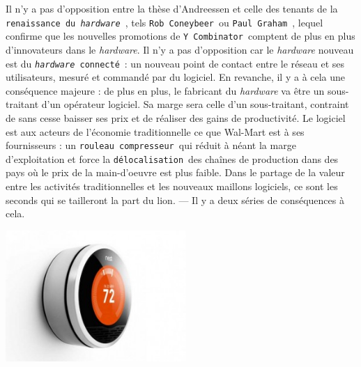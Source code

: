 \documentclass[11pt,twoside,a4paper]{article}
\begin{document}
\begin{minipage}[h]{12cm}
	Il n'y a pas d'opposition entre la th{\`e}se d'Andreessen et celle des tenants de la \texttt{renaissance du \emph{hardware}}~\footnotemark, tels \texttt{Rob Coneybeer}~\footnotemark ou \texttt{Paul Graham}~\footnotemark, lequel confirme que les nouvelles promotions de \texttt{Y Combinator}~\footnotemark comptent de plus en plus d'innovateurs dans le \emph{hardware}. Il n'y a pas d'opposition car le \emph{hardware} nouveau est du \texttt{\emph{hardware} connect{\'e}}~\footnotemark : un nouveau point de contact entre le r{\'e}seau et ses utilisateurs, mesur{\'e} et command{\'e} par du logiciel. En revanche, il y a {\`a} cela une cons{\'e}quence majeure : de plus en plus, le fabricant du \emph{hardware} va {\^e}tre un sous-traitant d'un op{\'e}rateur logiciel. Sa marge sera celle d'un sous-traitant, contraint de sans cesse baisser ses prix et de r{\'e}aliser des gains de productivit{\'e}. Le logiciel est aux acteurs de l'{\'e}conomie traditionnelle ce que Wal-Mart est {\`a} ses fournisseurs : un \texttt{rouleau compresseur}~\footnotemark qui r{\'e}duit {\`a} n{\'e}ant la marge d'exploitation et force la \texttt{d{\'e}localisation}~\footnotemark des cha{\^i}nes de production dans des pays o{\`u} le prix de la main-d'oeuvre est plus faible. Dans le partage de la valeur entre les activit{\'e}s traditionnelles et les nouveaux maillons logiciels, ce sont les seconds qui se tailleront la part du lion. --- Il y a deux s{\'e}ries de cons{\'e}quences {\`a} cela. 
\end{minipage} \hfill \begin{minipage}[h]{7.00cm}
	\includegraphics[width=6.85cm]{img/Nest-Thermostat-2-537x392-300x218.jpg}
\end{minipage}
\end{document}
